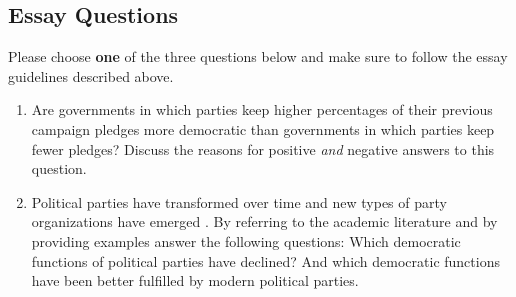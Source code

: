 \documentclass[abstract=on,parskip=full,headings=standardclasses,fontsize=11pt,paper=a4]{scrartcl}
\begin{document}
\subsection*{Essay Questions}

Please choose \textbf{one} of the three questions below and make sure to follow the essay guidelines described above. 

\begin{enumerate}


\item Are governments in which parties keep higher percentages of their previous campaign pledges more democratic than governments in which parties keep fewer pledges? Discuss the reasons for positive \textit{and} negative answers to this question.

\item Political parties have transformed  over time and new types of party organizations have emerged \autocite{katz95,katz09}. By referring to the academic literature and by providing examples answer the following questions: Which democratic functions of political parties have declined? And which democratic functions have been better fulfilled by modern political parties.








\end{enumerate}
\end{document}
